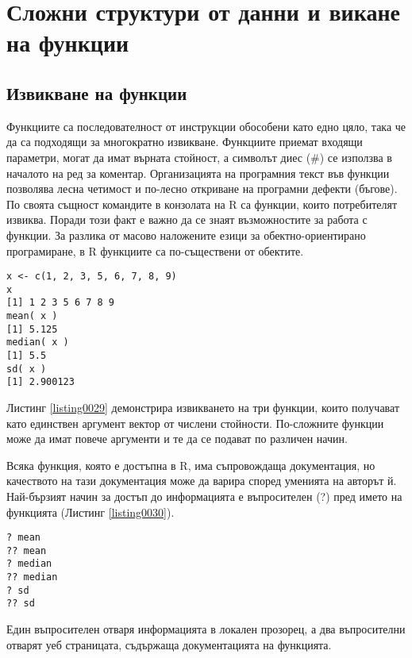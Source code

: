 ﻿\newpage
\chapter{Сложни структури от данни и викане на функции}
\label{chapter03}

\section{Извикване на функции}

Функциите са последователност от инструкции обособени като едно цяло, така че да са подходящи за многократно извикване. Функциите приемат входящи параметри, могат да имат върната стойност, а символът диес (\#) се използва в началото на ред за коментар. Организацията на програмния текст във функции позволява лесна четимост и по-лесно откриване на програмни дефекти (бъгове). По своята същност командите в конзолата на R са функции, които потребителят извиква. Поради този факт е важно да се знаят възможностите за работа с функции. За разлика от масово наложените езици за обектно-ориентирано програмиране, в R функциите са по-съществени от обектите. 

\begin{lstlisting}[caption=Извикване на функции, label=listing0029]
x <- c(1, 2, 3, 5, 6, 7, 8, 9)
x
[1] 1 2 3 5 6 7 8 9
mean( x )
[1] 5.125
median( x )
[1] 5.5
sd( x )
[1] 2.900123
\end{lstlisting}

Листинг \ref{listing0029} демонстрира извикването на три функции, които получават като единствен аргумент вектор от числени стойности. По-сложните функции може да имат повече аргументи и те да се подават по различен начин. 

Всяка функция, която е достъпна в R, има съпровождаща документация, но качеството на тази документация може да варира според уменията на авторът й. Най-бързият начин за достъп до информацията е въпросителен (?) пред името на функцията (Листинг \ref{listing0030}).

\begin{lstlisting}[caption=Документация за функциите, label=listing0030]
? mean
?? mean
? median
?? median
? sd
?? sd
\end{lstlisting}

Един въпросителен отваря информацията в локален прозорец, а два въпросителни отварят уеб страницата, съдържаща документацията на функцията.

